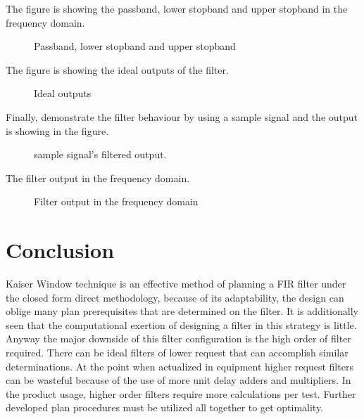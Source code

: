 \documentclass[twoside,12pt,times,onecolumn,a4paper]{report}
\begin{document}
The figure  is showing the passband, lower stopband and upper stopband in the frequency domain.

\begin{figure}[H]
  \centering
    
  \caption{Passband, lower stopband and upper stopband}
\end{figure}



The figure  is showing the ideal outputs of the filter.

\begin{figure}[H]
  \centering
    
  \caption{ Ideal outputs}
\end{figure}



Finally, demonstrate the filter behaviour by using a sample signal and the output is showing in the figure.

\begin{figure}[H]
  \centering
   
  \caption{sample signal's filtered output.}
\end{figure}



The filter output in the frequency domain.

\begin{figure}[H]
  \centering
    
  \caption{Filter output in the frequency domain}
\end{figure}






\chapter{Conclusion}
\hspace{4em}Kaiser Window technique is an effective method of planning a FIR filter under the closed form direct methodology, because of its adaptability, the design can oblige many plan prerequisites that are determined on the filter. It  is additionally seen that the computational exertion of designing a filter in this strategy is little. Anyway the major downside of this filter configuration is the high order of filter required. There can be ideal filters of lower request that can accomplish similar determinations. At the point when actualized in equipment higher request filters can be wasteful because of the use of more unit delay adders and multipliers. In the product usage, higher order filters require more calculations per test. Further developed plan procedures must be utilized all together to get optimality.
\end{document}
